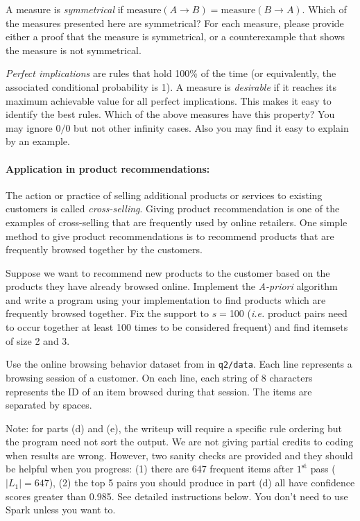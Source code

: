 \Solution{}

A measure is \textit{symmetrical} if $\text{measure}(A \rightarrow B) = \text{measure}(B \rightarrow A)$. Which of the measures presented here are symmetrical?  For each measure, please provide either a proof that the measure is symmetrical, or a counterexample that shows the measure is not symmetrical.

\Solution{}

\textit{Perfect implications} are rules that hold 100\% of the time (or equivalently, the associated conditional probability is 1). A measure is \textit{desirable} if it reaches its maximum achievable value for all perfect implications. This makes it easy to identify the best rules. Which of the above measures have this property? You may ignore $0/0$ but not other infinity cases. Also you may find it easy to explain by an example.

\paragraph{Application in product recommendations:}  The action or practice of selling additional products or services to existing customers is called \textit{cross-selling}. Giving product recommendation is one of the examples of cross-selling that are frequently used by online retailers. One simple method to give product recommendations is to recommend products that are frequently browsed together by the customers.

Suppose we want to recommend new products to the customer based on the products they have already browsed online.
Implement the \emph{A-priori} algorithm and write a program using your implementation to find products which are frequently browsed together. Fix the support to $s=$100 (\emph{i.e.} product pairs need to occur together at least 100 times to be considered frequent) and find itemsets of size 2 and 3. 

Use the online browsing behavior dataset from {\color{blue}{\tt browsing.txt}} in {\tt q2/data}. Each line represents a browsing session of a customer. On each line, each string of 8 characters represents the ID of an item browsed during that session. The items are separated by spaces.

Note: for parts (d) and (e), the writeup will require a specific rule ordering but the program need not sort the output. We are not giving partial credits to coding when results are wrong. However, two sanity checks are provided and they should be helpful when you progress: (1) there are 647 frequent items after $1^{\textrm{st}}$ pass ($|L_1|=647$), (2) the top 5 pairs you should produce in part (d) all have confidence scores greater than 0.985. See detailed instructions below. You don't need to use Spark unless you want to.

